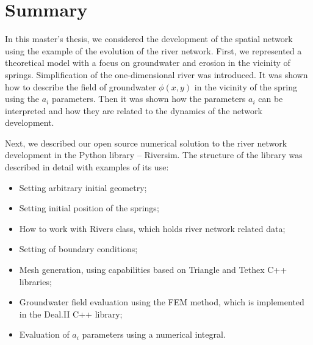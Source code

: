 \documentclass[]{pracamgr}
\begin{document}
  \chapter{Summary}

    In this master's thesis, we considered the development of the spatial network using the example of the evolution of the river network. First, we represented a theoretical model with a focus on groundwater and erosion in the vicinity of springs. Simplification of the one-dimensional river was introduced. It was shown how to describe the field of groundwater $\phi(x, y)$ in the vicinity of the spring using the $a_i$ parameters. Then it was shown how the parameters $a_i$ can be interpreted and how they are related to the dynamics of the network development.\par

    Next, we described our open source numerical solution to the river network development in the Python library -- Riversim. The structure of the library was described in detail with examples of its use: 
    
    \begin{itemize}
      \item Setting arbitrary initial geometry;
      \item Setting initial position of the springs;
      \item How to work with Rivers class, which holds river network related data;
      \item Setting of boundary conditions;
      \item Mesh generation, using capabilities based on Triangle and Tethex C++ libraries;
      \item Groundwater field evaluation using the FEM method, which is implemented in the Deal.II C++ library;
      \item Evaluation of $a_i$ parameters using a numerical integral.
    \end{itemize}
\end{document}
